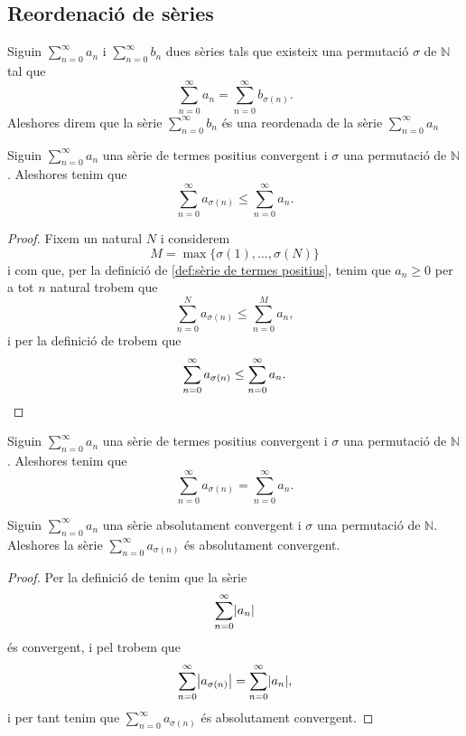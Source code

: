\documentclass[../../Main.tex]{subfiles}
\begin{document}
	\subsection{Reordenació de sèries}
	\begin{definition}
		\label{def:reordenada d'una sèrie}
		Siguin \(\sum_{n=0}^{\infty}a_{n}\) i \(\sum_{n=0}^{\infty}b_{n}\) dues sèries tals que existeix una permutació \(\sigma\) de \(\mathbb{N}\) tal que
		\[\sum_{n=0}^{\infty}a_{n}=\sum_{n=0}^{\infty}b_{\sigma(n)}.\]
		Aleshores direm que la sèrie \(\sum_{n=0}^{\infty}b_{n}\) és una reordenada de la sèrie \(\sum_{n=0}^{\infty}a_{n}\)
	\end{definition}
	\begin{lemma}
		\label{lema:la reordenada d'una sèrie de termes positius convergent és més petita que la sèrie}
		Siguin \(\sum_{n=0}^{\infty}a_{n}\) una sèrie de termes positius convergent i \(\sigma\) una permutació de \(\mathbb{N}\). Aleshores tenim que
		\[\sum_{n=0}^{\infty}a_{\sigma(n)}\leq\sum_{n=0}^{\infty}a_{n}.\]
		\begin{proof}
			Fixem un natural \(N\) i considerem
			\[M=\max\{\sigma(1),\dots,\sigma(N)\}\]
			i com que, per la definició de \ref{def:sèrie de termes positius}, tenim que \(a_{n}\geq0\) per a tot \(n\) natural trobem que
			\[\sum_{n=0}^{N}a_{\sigma(n)}\leq\sum_{n=0}^{M}a_{n},\]
			i per la definició de  trobem que
			\[\sum_{n=0}^{\infty}a_{\sigma(n)}\leq\sum_{n=0}^{\infty}a_{n}.\qedhere\]
		\end{proof}
	\end{lemma}
	\begin{corollary}
		\label{cor:la reordenada d'una sèrie de termes positius convergent conserva la sèrie}
		Siguin \(\sum_{n=0}^{\infty}a_{n}\) una sèrie de termes positius convergent i \(\sigma\) una permutació de \(\mathbb{N}\). Aleshores tenim que
		\[\sum_{n=0}^{\infty}a_{\sigma(n)}=\sum_{n=0}^{\infty}a_{n}.\]
	\end{corollary}
	\begin{proposition}
		\label{prop:la reordenada d'una sèrie absolutament convergent és absolutament convergent}
		Siguin \(\sum_{n=0}^{\infty}a_{n}\) una sèrie absolutament convergent i \(\sigma\) una permutació de \(\mathbb{N}\). Aleshores la sèrie \(\sum_{n=0}^{\infty}a_{\sigma(n)}\) és absolutament convergent.
		\begin{proof}
			Per la definició de  tenim que la sèrie
			\[\sum_{n=0}^{\infty}\abs{a_{n}}\]
			és convergent, i pel \corollari{}  trobem que
			\[\sum_{n=0}^{\infty}\abs{a_{\sigma(n)}}=\sum_{n=0}^{\infty}\abs{a_{n}},\]
			i per tant tenim que \(\sum_{n=0}^{\infty}a_{\sigma(n)}\) és absolutament convergent.
		\end{proof}
	\end{proposition}
\end{document}
